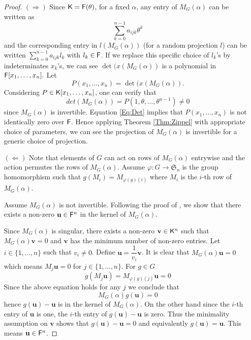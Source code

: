 \begin{proof}
$(\Rightarrow)$ Since ${\mathsf{K}} = {\mathsf{F}}(\theta)$, for a fixed $\alpha$, any entry of $M_G(\alpha)$ can be written as 
\begin{equation}\label{Eq:PrimElm}
\sum_{k= 0}^{n-1} a_{ijk}\theta^k
\end{equation}
 and the corresponding entry in $l(M_G(\alpha))$ (for a random projection $l$)
 can be written $\sum_{k= 0}^{n-1} a_{ijk}l_k$ with $l_k\in {\mathsf{F}}$. If we replace this specific choice of $l_k$'s by 
 indeterminates $x_k$'s, we can see $\det(x(M_G(\alpha))$ is a polynomial in ${\mathsf{F}}[x_1, \ldots, x_n].$ Let 
 $$P(x_1, \ldots, x_n) = \det(x(M_G(\alpha)).$$ 
 Considering $P \in {\mathsf{K}}[x_1, \ldots , x_n]$, one can verify that 
 \begin{equation}\label{Eq:Det}
 det(M_G(\alpha))= P(1, \theta, \ldots, \theta^{n-1}) \neq 0
 \end{equation}
 since $M_G(\alpha)$ is invertible. Equation \ref{Eq:Det} implies that $P(x_1, \ldots, x_n)$ is not identically zero over ${\mathsf{F}}$. Hence applying Theorem \ref{Thm:Zippel} with appropriate choice of parameters, we can see 
 the projection of $M_G(\alpha)$ is invertible for a generic choice of projection. 
 
 $(\Leftarrow)$  Note that elements of $G$ can act on 
 rows of $M_G(\alpha)$ entrywise and the action permutes the rows of $M_G(\alpha)$. Assume $\varphi : G \longrightarrow \mathfrak{S}_n$ is the group homomorphism 
 such that $g(M_i) = M_{\varphi(g)(i)}$ where $M_i$ is the $i$-th row of $M_G(\alpha)$.
 
 Assume $M_G(\alpha)$ is not invertible. Following the proof of \cite[Lemma 4]{Armin}, we show that there exists a non-zero $\textbf{u} \in {\mathsf{F}}^n$ in the kernel of $M_G(\alpha)$. 
 
 Since $M_G(\alpha)$ is singular, there exists a non-zero $\textbf{v} \in {\mathsf{K}}^n$  such that $M_G(\alpha)\textbf{v} = 0$ and $\textbf{v}$ has the minimum number of non-zero entries. Let $i \in  \lbrace 1, \ldots , n \rbrace$ such that $v_i \neq 0$. Define $\textbf{u} = \dfrac{1}{v_i}\textbf{v}$. It is clear  that $M_G(\alpha)\textbf{u} = 0$ which means $M_j \textbf{u} = 0 $ for $j \in \lbrace 1, \ldots, n \rbrace$. For $g \in G$
 \begin{equation}
  g(M_j \textbf{u}) = M_{\varphi(g)(j)} \textbf{u}= 0
 \end{equation}
 Since the above equation holds for any $j$ we conclude that $$M_G(\alpha)g(\textbf{u})= 0$$ hence
 $g(\textbf{u})-\textbf{u}$ is in the kernel of $M_G(\alpha)$. On the other hand since the $i$-th entry 
 of $\textbf{u}$ is one, the $i$-th entry of $g(\textbf{u}) -\textbf{u}$ is zero. Thus the minimality assumption
 on $\textbf{v}$ shows that $g(\textbf{u}) -\textbf{u} = 0$ and equivalently $g(\textbf{u})=\textbf{u}$. This 
 means $\textbf{u} \in {\mathsf{F}}^n$.
 

\end{proof}
